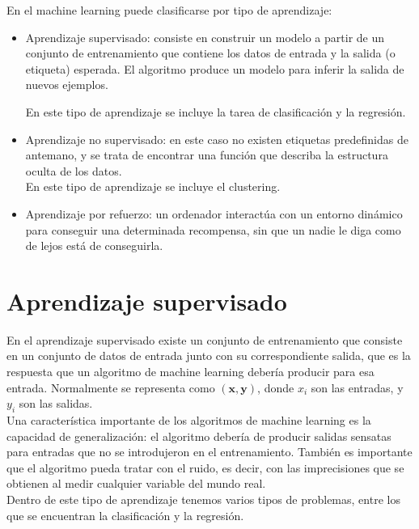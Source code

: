 En el machine learning puede clasificarse por tipo de aprendizaje:

\begin{itemize}
	\item Aprendizaje supervisado: consiste en construir un modelo a partir de un conjunto de entrenamiento que contiene los datos de entrada y la salida (o etiqueta) esperada. El algoritmo produce un modelo para inferir la salida de nuevos ejemplos.
	
	En este tipo de aprendizaje se incluye la tarea de clasificación y la regresión.
	
	\item Aprendizaje no supervisado: en este caso no existen etiquetas predefinidas de antemano, y se trata de encontrar una función que describa la estructura oculta de los datos.\\
	
	En este tipo de aprendizaje se incluye el clustering.
	
	\item Aprendizaje por refuerzo: un ordenador interactúa con un entorno dinámico para conseguir una determinada recompensa, sin que un nadie le diga como de lejos está de conseguirla.  
\end{itemize}

\section{Aprendizaje supervisado}

En el aprendizaje supervisado existe un conjunto de entrenamiento que consiste en un conjunto de datos de entrada junto con su correspondiente salida, que es la respuesta que un algoritmo de machine learning debería producir para esa entrada. Normalmente se representa como $(\mathbf{x}, \mathbf{y})$, donde $x_i$ son las entradas, y $y_i$ son las salidas.\\

Una característica importante de los algoritmos de machine learning es la capacidad de generalización: el algoritmo debería de producir salidas sensatas para entradas que no se introdujeron en el entrenamiento. También es importante que el algoritmo pueda tratar con el ruido, es decir, con las imprecisiones que se  obtienen al medir cualquier variable del mundo real.\\

Dentro de este tipo de aprendizaje tenemos varios tipos de problemas, entre los que se encuentran la clasificación y la regresión.

